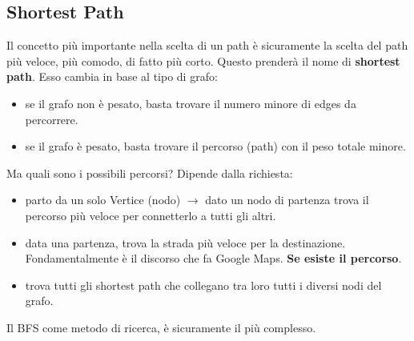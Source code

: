 \subsection*{Shortest Path}
Il concetto più importante nella scelta di un path è sicuramente la scelta del path più veloce, più comodo, di fatto più corto. Questo prenderà il nome di \textbf{shortest path}. Esso cambia in base al tipo di grafo:
\begin{itemize}
    \item se il grafo non è pesato, basta trovare il numero minore di edges da percorrere.
    \item se il grafo è pesato, basta trovare il percorso (path) con il peso totale minore. 
\end{itemize}
Ma quali sono i possibili percorsi? Dipende dalla richiesta:
\begin{itemize}
    \item parto da un solo Vertice (nodo) $\rightarrow$ dato un nodo di partenza trova il percorso più veloce per connetterlo a tutti gli altri. 
    \item data una partenza, trova la strada più veloce per la destinazione. Fondamentalmente è il discorso che fa Google Maps. \textbf{Se esiste il percorso}. 
    \item trova tutti gli shortest path che collegano tra loro tutti i diversi nodi del grafo. 
\end{itemize}
Il BFS come metodo di ricerca, è sicuramente il più complesso.
\newpage
